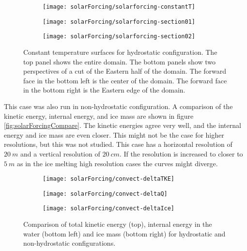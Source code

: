 \documentclass[11pt]{article}
\begin{document}
\clearpage
\begin{figure}[h!]
\centering
\begin{subfigure}{0.99\linewidth}
\texttt{[image: solarForcing/solarforcing-constantT]}
\end{subfigure}

\begin{subfigure}{0.49\linewidth}
\texttt{[image: solarForcing/solarforcing-section01]}
\end{subfigure}
\begin{subfigure}{0.49\linewidth}
\texttt{[image: solarForcing/solarforcing-section02]}
\end{subfigure}
\caption{Constant temperature surfaces for hydrostatic configuration. The top panel shows the entire domain. The bottom panels show two perspectives of a cut of the Eastern half of the domain. The forward face in the bottom left is the center of the domain. The forward face in the bottom right is the Eastern edge of the domain.}
\label{fig:solarForcingConstantT}
\end{figure}

This case was also run in non-hydrostatic configuration. A comparison of the kinetic energy, internal energy, and ice mass are shown in figure \ref{fig:solarForcingCompare}. The kinetic energies agree very well, and the internal energy and ice mass are even closer. This might not be the case for higher resolutions, but this was not studied. This case has a horizontal resolution of $\SI{20}{m}$ and a vertical resolution of $\SI{20}{cm}$. If the resolution is increased to closer to $\SI{5}{m}$ as in the ice melting high resolution cases the curves might diverge.

\clearpage
\begin{figure}[h!]
\centering
\begin{subfigure}{0.98\linewidth}
\texttt{[image: solarForcing/convect-deltaTKE]}
\end{subfigure}

\begin{subfigure}{0.49\linewidth}
\texttt{[image: solarForcing/convect-deltaQ]}
\end{subfigure}
\begin{subfigure}{0.49\linewidth}
\texttt{[image: solarForcing/convect-deltaIce]}
\end{subfigure}
\caption{Comparison of total kinetic energy (top), internal energy in the water (bottom left) and ice mass (bottom right) for hydrostatic and non-hydrostatic configurations.}
\end{figure}
\end{document}
